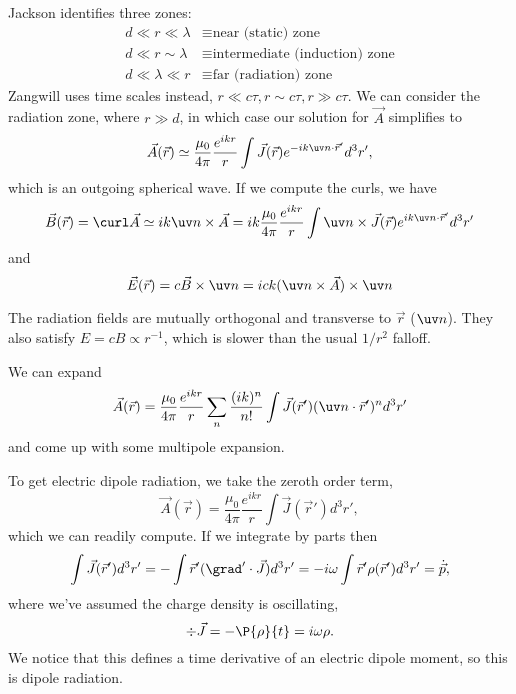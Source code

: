 Jackson identifies three zones:
\begin{align}
    d \ll r \ll \lambda &\equiv \text{near (static) zone}\\
    d \ll r \sim \lambda &\equiv \text{intermediate (induction) zone}\\
    d \ll \lambda \ll r &\equiv \text{far (radiation) zone}
\end{align}
Zangwill uses time scales instead, $r\ll c\tau, r \sim c\tau, r \gg c \tau$. We can consider the radiation zone, where $r\gg d$, in which case our solution for $\vec A$ simplifies to 
\begin{equation}
    \vec A(\vec r) \simeq \frac{\mu_0}{4\pi} \frac{e^{ikr}}{r}\int \vec J(\vec r) e^{-ik \uv n \cdot \vec r'}d^3 r',
\end{equation}
which is an outgoing spherical wave. If we compute the curls, we have
\begin{equation}
    \vec B(\vec r) = \curl \vec A \simeq ik \uv n \times \vec A = ik \frac{\mu_0}{4\pi} \frac{e^{ikr}}{r} \int \uv n \times \vec J(\vec r) e^{ik \uv n \cdot \vec r'} d^3r'
\end{equation}
and
\begin{equation}
    \vec E(\vec r) = c\vec B \times \uv n = ick (\uv n \times \vec A) \times \uv n
\end{equation}

The radiation fields are mutually orthogonal and transverse to $\vec r$ ($\uv n$). They also satisfy $E=cB\propto r^{-1}$, which is slower than the usual $1/r^2$ falloff.

We can expand
\begin{equation}
    \vec A(\vec r)=\frac{\mu_0}{4\pi} \frac{e^{ikr}}{r} \sum_n \frac{(ik)^n}{n!} \int \vec J(\vec r') (\uv n \cdot \vec r')^n d^3 r'
\end{equation}
and come up with some multipole expansion.

To get electric dipole radiation, we take the zeroth order term,
\begin{equation}
    \vec A(\vec r) = \frac{\mu_0}{4\pi} \frac{e^{ikr}}{r}\int \vec J(\vec r') d^3 r',
\end{equation}
which we can readily compute. If we integrate by parts then
\begin{equation}
    \int \vec J(\vec r') d^3 r' = -\int \vec r'(\grad'\cdot \vec J) d^3 r' = -i\omega \int \vec r' \rho(\vec r') d^3 r'= \dot{\vec p},
\end{equation}
where we've assumed the charge density is oscillating,
\begin{equation}
    \div \vec J = -\P{\rho}{t} = i\omega \rho.
\end{equation}
We notice that this defines a time derivative of an electric dipole moment, so this is dipole radiation.

